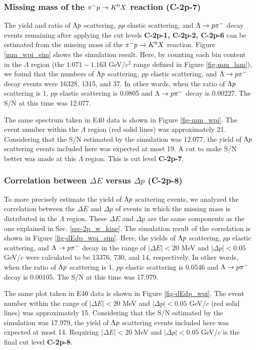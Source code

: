 \subsubsection{Missing mass of the $\pi^- p \to K^0 X$ reaction ({\bf C-2p-7})}

The yield and ratio of $\Lambda p$ scattering, $pp$ elastic scattering, and $\Lambda\to p\pi^{-}$ decay events remaining after applying the cut levels {\bf C-2p-1, C-2p-2, C-2p-6} can be estimated from the missing mass of the $\pi^- p \to K^0 X$ reaction. Figure \ref{mm_wpi_sim} shows the simulation result. Here, by counting each bin content in the $\Lambda$ region (the $1.071-1.163$ GeV/$c^{2}$ range defined in Figure \ref{fig-mm_lam}), we found that the numbers of $\Lambda p$ scattering, $pp$ elastic scattering, and $\Lambda\to p\pi^{-}$ decay events were 16328, 1315, and 37. In other words, when the ratio of $\Lambda p$ scattering is 1, $pp$ elastic scattering is 0.0805 and $\Lambda\to p\pi^{-}$ decay is 0.00227. The S/N at this time was 12.077. 

The same spectrum taken in E40 data is shown in Figure \ref{fig-mm_wpi}. The event number within the $\Lambda$ region (red solid lines) was approximately 21. Considering that the S/N estimated by the simulation was 12.077, the yield of $\Lambda p$ scattering events included here was expected at most 19. A cut to make S/N better was made at this $\Lambda$ region. This is cut level {\bf C-2p-7}.

\subsubsection{Correlation between $\Delta E$ versus $\Delta p$ ({\bf C-2p-8})}

To more precisely estimate the yield of $\Lambda p$ scattering events, we analyzed the correlation between the $\Delta E$ and $\Delta p$ of events in which the missing mass is distributed in the $\Lambda$ region.
These $\Delta E$ and $\Delta p$ are the same components as the one explained in Sec. \ref{sec-2p_w_kine}.
The simulation result of the correlation is shown in Figure \ref{fig-dEdp_wpi_sim}. Here, the yields of $\Lambda p$ scattering, $pp$ elastic scattering, and $\Lambda\to p\pi^{-}$ decay in the range of $|\Delta E|<20$ MeV and $|\Delta p|<0.05$ GeV/$c$ were calculated to be 13376, 730, and 14, respectively. In other words, when the ratio of $\Lambda p$ scattering is 1, $pp$ elastic scattering is 0.0546 and $\Lambda\to p\pi^{-}$ decay is 0.00105. The S/N at this time was 17.979.

The same plot taken in E40 data is shown in Figure \ref{fig-dEdp_wpi}. The event number within the range of $|\Delta E|<20$ MeV and $|\Delta p|<0.05$ GeV/$c$ (red solid lines) was approximately 15. Considering that the S/N estimated by the simulation was 17.979, the yield of $\Lambda p$ scattering events included here was expected at most 14. Requiring $|\Delta E|<20$ MeV and $|\Delta p|<0.05$ GeV/$c$ is the final cut level {\bf C-2p-8}.

